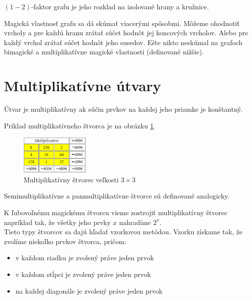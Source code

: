 \begin{note} $(1-2)$-faktor grafu je jeho rozklad na izolované hrany a kružnice.
\end{note} 

Magická vlastnosť grafu sa dá skúmať viacerými spôsobmi. Môžeme ohodnotiť vrcholy a pre každú hranu zrátať súčet hodnôt jej koncových vrcholov. Alebo pre každý vrchol zrátať súčet hodnôt jeho susedov. Ešte nikto neskúmal na grafoch bimagické a multiplikatívne magické vlastnosti (definované nižšie). \\



\section{Multiplikatívne útvary}
\begin{definition} Útvar je multiplikatívny ak súčin prvkov na každej jeho priamke je konštantný.
\end{definition}

Príklad multiplikatívneho štvorca je na obrázku \ref{obr:fig_basic_mult_3x3}.

\begin{figure}[H]
\centerline{\includegraphics[width=0.3\textwidth]{images/basic_mult_3x3}}
\caption[Multiplikatívny štvorec veľkosti $3 \times 3$]{Multiplikatívny štvorec veľkosti $3 \times 3$ \cite{multimagie}}
\label{obr:fig_basic_mult_3x3}
\end{figure}

\begin{note} Semimultiplikatívne a panmultiplikatívne štvorce sú definované analogicky.
\end{note}

K ľubovoľnému magickému štvorcu vieme zostrojiť multiplikatívny štvorec napríklad tak, že všetky jeho prvky $x$ nahradíme $2^x$. \\

Tieto typy štvorcov sa dajú hľadať vzorkovou metódou. Vzorku získame tak, že zvolíme niekoľko prvkov štvorca, pričom:
\begin{itemize}
\item v každom riadku je zvolený práve jeden prvok
\item v každom stĺpci je zvolený práve jeden prvok
\item na každej diagonále je zvolený práve jeden prvok
\end{itemize}

